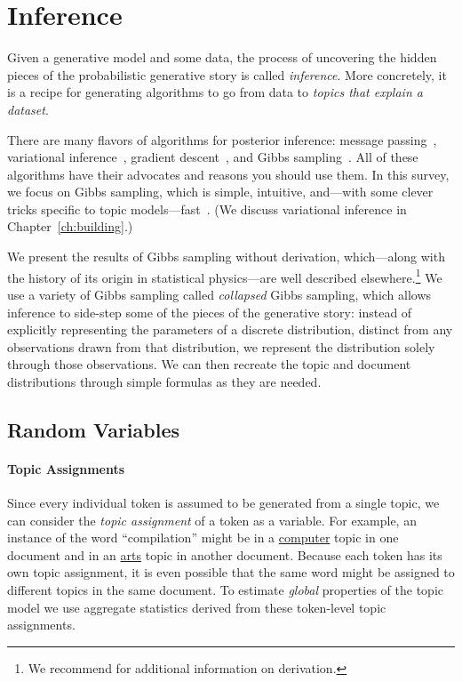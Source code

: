 \section{Inference}

Given a generative model and some data, the process of uncovering the hidden
 pieces of the probabilistic generative story is called \emph{inference}.  More
concretely, it is a recipe for generating algorithms to go from data to
\emph{topics that explain a dataset}.

There are many flavors of algorithms for posterior inference: message
passing~\citep{zeng-13}, variational inference~\citep{blei-03},
gradient descent~\citep{hoffman-10}, and Gibbs
sampling~\citep{griffiths-04}.  All of these algorithms have their
advocates and reasons you should use them.  In this survey, we focus
on Gibbs sampling, which is simple, intuitive, and---with some clever
tricks specific to topic models---fast~\citep{yao-09}.  (We discuss
variational inference in Chapter~\ref{ch:building}.)

We present the results of Gibbs sampling without derivation,
which---along with the history of its origin in statistical
physics---are well described elsewhere.\footnote{We recommend
  \citet{resnik-09} for additional information on derivation.} We use
a variety of Gibbs sampling called \emph{collapsed} Gibbs sampling,
which allows inference to side-step some of the pieces of the
generative story: instead of explicitly representing the parameters of
a discrete distribution, distinct from any observations drawn from
that distribution, we represent the distribution solely through those
observations.  We can then recreate the topic and document
distributions through simple formulas as they are needed.

\subsection{Random Variables}

\paragraph{Topic Assignments}

Since every individual token is assumed to be generated from a single topic,
we can consider the {\em topic assignment} of a token as a variable.  For example,
an instance of the word ``compilation'' might be in a \underline{computer} topic in one
document and in an \underline{arts} topic in another document.  Because each token has its own
topic assignment, it is even possible that the
same word might be assigned to different topics in the same document.
To estimate \emph{global} properties of the topic model we use aggregate statistics derived from these token-level topic assignments.

